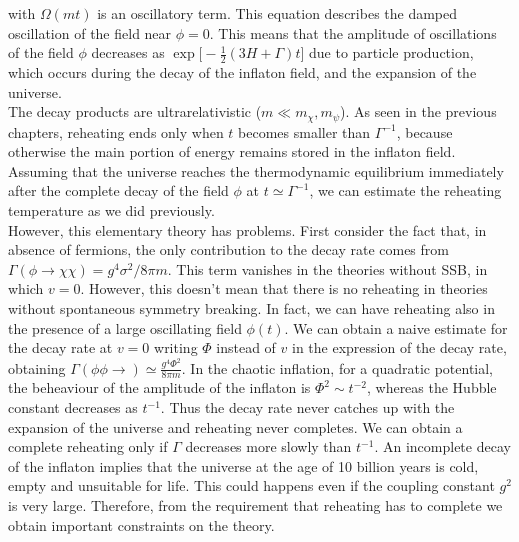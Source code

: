 \documentclass[11pt,a4paper,twoside]{book}
\begin{document}
with $ \Omega(mt) $ is an oscillatory term. This equation describes the damped oscillation of the field near $ \phi=0 $. This means that the amplitude of oscillations of the field $\phi$ decreases as $ \exp\Big[-\frac{1}{2}(3H+\Gamma)t\Big] $ due to particle production, which occurs during the decay of the inflaton field, and the expansion of the universe.\\
The decay products are ultrarelativistic ($ m \ll m_{\chi},m_{\psi} $). As seen in the previous chapters, reheating ends only when $ t $ becomes smaller than $\Gamma^{-1}$, because otherwise the main portion of energy remains stored in the inflaton field. Assuming that the universe reaches the thermodynamic equilibrium immediately after the complete decay of the field $ \phi $ at $ t \simeq \Gamma^{-1} $, we can estimate the reheating temperature as we did previously. \\
However, this elementary theory has problems. First consider the fact that, in absence of fermions, the only contribution to the decay rate comes from $\Gamma(\phi \rightarrow \chi \chi) = g^{4}\sigma^{2}/8\pi m $. This term vanishes in the theories without SSB, in which $ v=0 $. However, this doesn't mean that there is no reheating in theories without spontaneous symmetry breaking. In fact, we can have reheating also in the presence of a large oscillating field $\phi(t)$. We can obtain a naive estimate for the decay rate at $ v=0 $ writing $\Phi$ instead of $ v $ in the expression of the decay rate, obtaining $ \Gamma(\phi \phi \rightarrow) \simeq \frac{g^{4}\Phi^{2}}{8\pi m} $. In the chaotic inflation, for a quadratic potential, the beheaviour of the amplitude of the inflaton is $ \Phi^{2}\sim t^{-2} $, whereas the Hubble constant decreases as $ t^{-1} $. Thus the decay rate never catches up with the expansion of the universe and reheating never completes. We can obtain a complete reheating only if $\Gamma$ decreases more slowly than $ t^{-1} $. An incomplete decay of the inflaton implies that the universe at the age of 10 billion years is cold, empty and unsuitable for life. This could happens even if the coupling constant $ g^{2} $ is very large. Therefore, from the requirement that reheating has to complete we obtain important constraints on the theory.\\
\end{document}
